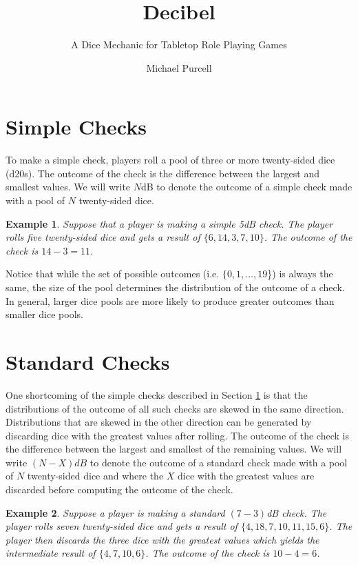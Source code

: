 \documentclass{scrartcl}
\title{Decibel}
\subtitle{A Dice Mechanic for Tabletop Role Playing Games}
\author{Michael Purcell}
\date{}
\newtheorem{example}{Example}
\begin{document}
\maketitle

\section{Simple Checks}\label{section:simple_checks}
To make a simple check, players roll a pool of three or more twenty-sided dice (d20s).  The outcome of the check is the difference between the largest and smallest values. We will write $N$dB to denote the outcome of a simple check made with a pool of $N$ twenty-sided dice.

\begin{example}
Suppose that a player is making a simple 5dB check.  The player rolls five twenty-sided dice and gets a result of $\{6,14,3,7,10\}$.  The outcome of the check is $14-3 = 11$.
\end{example}

Notice that while the set of possible outcomes (i.e. $\{0,1,\ldots,19$\}) is always the same, the size of the pool determines the distribution of the outcome of a check.  In general, larger dice pools are more likely to produce greater outcomes than smaller dice pools.

\section{Standard Checks}
One shortcoming of the simple checks described in Section \ref{section:simple_checks} is that the distributions of the outcome of all such checks are skewed in the same direction. Distributions that are skewed in the other direction can be generated by discarding dice with the greatest values after rolling. The outcome of the check is the difference between the largest and smallest of the remaining values. We will write $(N-X)dB$ to denote the outcome of a standard check made with a pool of $N$ twenty-sided dice and where the $X$ dice with the greatest values are discarded before computing the outcome of the check.

\begin{example}
Suppose a player is making a standard $(7-3)$dB check.  The player rolls seven twenty-sided dice and gets a result of $\{4, 18, 7, 10, 11, 15, 6\}$.  The player then discards the three dice with the greatest values which yields the intermediate result of $\{4, 7, 10, 6\}$.   The outcome of the check is $10-4 = 6$.
\end{example}
\end{document}
